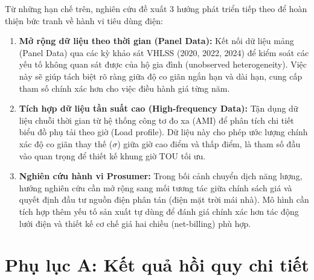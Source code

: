 \documentclass[12pt,a4paper,oneside]{article}
\begin{document}
Từ những hạn chế trên, nghiên cứu đề xuất 3 hướng phát triển tiếp theo để hoàn thiện bức tranh về hành vi tiêu dùng điện:

\begin{enumerate}
	\item \textbf{Mở rộng dữ liệu theo thời gian (Panel Data):} Kết nối dữ liệu mảng (Panel Data) qua các kỳ khảo sát VHLSS (2020, 2022, 2024) để kiểm soát các yếu tố không quan sát được của hộ gia đình (unobserved heterogeneity). Việc này sẽ giúp tách biệt rõ ràng giữa độ co giãn ngắn hạn và dài hạn, cung cấp tham số chính xác hơn cho việc điều hành giá từng năm.
	
	\item \textbf{Tích hợp dữ liệu tần suất cao (High-frequency Data):} Tận dụng dữ liệu chuỗi thời gian từ hệ thống công tơ đo xa (AMI) để phân tích chi tiết biểu đồ phụ tải theo giờ (Load profile). Dữ liệu này cho phép ước lượng chính xác độ co giãn thay thế ($\sigma$) giữa giờ cao điểm và thấp điểm, là tham số đầu vào quan trọng để thiết kế khung giờ TOU tối ưu.
	
	\item \textbf{Nghiên cứu hành vi Prosumer:} Trong bối cảnh chuyển dịch năng lượng, hướng nghiên cứu cần mở rộng sang mối tương tác giữa chính sách giá và quyết định đầu tư nguồn điện phân tán (điện mặt trời mái nhà). Mô hình cần tích hợp thêm yếu tố sản xuất tự dùng để đánh giá chính xác hơn tác động lưới điện và thiết kế cơ chế giá hai chiều (net-billing) phù hợp.
\end{enumerate}

\newpage	
\appendix
\renewcommand{\thetable}{\Alph{section}\arabic{table}}
\renewcommand{\thefigure}{\Alph{section}\arabic{figure}}
\renewcommand{\thesubsection}{\Alph{section}.\arabic{subsection}}
\setcounter{table}{0}
\setcounter{figure}{0}

\section{Phụ lục A: Kết quả hồi quy chi tiết}
\end{document}
